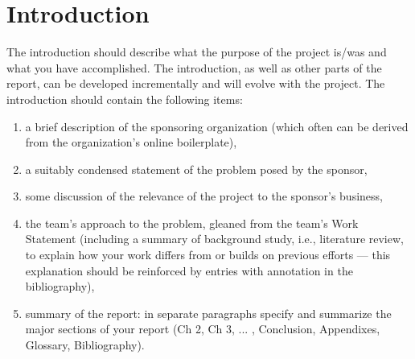 \chapter{Introduction}\label{Ch:Introduction}

The introduction should describe what the purpose of the project is/was and what you have accomplished.
The introduction, as well as other parts of the report, can be developed incrementally and will evolve with the project.
The introduction should contain the following items:
\begin{enumerate}{}
\item a brief description of the sponsoring organization (which often can be derived from the organization's online boilerplate), 
\item a suitably condensed statement of the problem posed by the sponsor, 
\item some discussion of the relevance of the project to the sponsor's business, 
\item the team's approach to the problem, gleaned from the team's Work Statement (including a summary of background study, i.e., literature review, to explain how your work differs from or builds on previous efforts --- this explanation should be reinforced by entries with annotation in the bibliography),
\item summary of the report: in separate paragraphs specify and summarize the major sections of your report (Ch 2, Ch 3, ... , Conclusion,  Appendixes, Glossary, Bibliography).
\end{enumerate}


\endinput